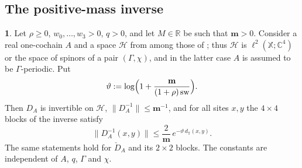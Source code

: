 \documentclass[11pt]{amsart}
\newcommand{\namedhead}{}
\theoremstyle{definition}
\newtheorem*{namedinner}{\namedhead}
\newenvironment{named}[1]{\renewcommand{\namedhead}{#1}\begin{namedinner}}{\end{namedinner}}
\begin{document}
\subsection{The positive-mass inverse}
\begin{named}{Lemma 5.1}
Let $\rho\ge0$, $w_0,\dots,w_3>0$, $q>0$, and let $M\in\mathbb R$ be such that $\mathbf m>0$.
Consider a real one-cochain $A$ and a space $\mathcal H$ from among those of \cite[Proposition~3.18]{QEDII}; thus $\mathcal H$ is $\ell^2(\mathbb X;\mathbb C^4)$ or the space of spinors of a pair $(\Gamma,\chi)$, and in the latter case $A$ is assumed to be $\Gamma$-periodic.
Put
\begin{equation*}
\vartheta:=\log\Bigl(1+\frac{\mathbf m}{(1+\rho)\,\mathrm{sw}}\Bigr).
\end{equation*}
Then $D_A$ is invertible on $\mathcal H$, $\|D_A^{-1}\|\le\mathbf m^{-1}$, and for all sites $x,y$ the $4\times4$ blocks of the inverse satisfy
\begin{equation*}
\|D_A^{-1}(x,y)\|\le\frac{2}{\mathbf m}\,e^{-\vartheta\,d_{\mathbb T}(x,y)}.
\end{equation*}
The same statements hold for $\check D_A$ and its $2\times2$ blocks.
The constants are independent of $A$, $q$, $\Gamma$ and $\chi$.
\end{named}
\end{document}
